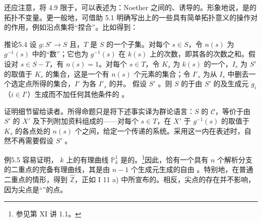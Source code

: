 还应注意，将 4.9 限于，可以表述为：Noether 之间的、诱导的。形象地说，是的拓扑不变量。更一般地，可借助 5.1 明确写出上的一些具有简单拓扑意义的操作对的作用，例如沿点集将“捏合”。比如得到：
\begin{SGAresult}{推论}{5.4}
设 $g:S'\to S$ 且，$T$ 是 $S$ 的一个子集。对每个 $s\in S$，令 $n(s)$ 为 $g^{-1}(s)$ 中的“数”；它也为 $g^{-1}(s)$ 在 $k(s)$ 上的次数，即其各的次数之和。假设对 $s\in S-T$，有 $n(s)=1$。对每个 $s\in T$，令 $K_s$ 为 $k(s)$ 的一个，$I_s$ 为 $S'$ 的取值于 $K_s$ 的集合，这是一个有 $n(s)$ 个元素的集合；令 $I'_s$ 为从 $I_s$ 中删去一个选定点所得的集合，$I'$ 为各 $I'_s$ 的并。
假设 $S'$ 。则 $S$ 的于由 $S'$ 的及生成元 $g_i$（$i\in I'$）生成而不加任何其他条件的 。
\end{SGAresult}
证明细节留给读者。所得命题只是将下述事实译为群论语言：$S$ 的 $\mathcal C$，等价于由 $S'$ 的 $X'$ 及下列附加资料组成的——对每个 $s\in T$，在 $X'$ 于 $g^{-1}(s)$ 的取值于 $K_s$ 的各点处的 $n(s)$ 个之间，给定一个传递的系统。采用这一内在表述时，自然不再需要假设 $S'$ 。
\begin{SGAresult}{例}{5.5}
容易证明， $k$ 上的有理曲线 $\mathbb P^1_k$ 是的。\footnote{参见第 XI 讲 1.1。}因此，恰有一个具有 $n$ 个解析分支的二重点的完备有理曲线，其是由 $n-1$ 个生成元生成的自由 。特别地，在普通二重点的情形，得到 $\widehat{\mathbb Z}$，正如 I 11 a) 中所宣布的。相反，尖点的存在并不影响，因为尖点是“”的点。
\end{SGAresult}
